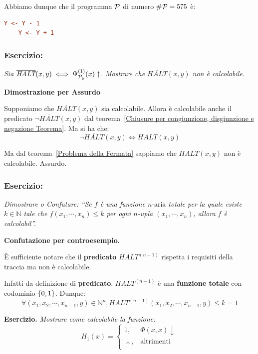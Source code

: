 Abbiamo dunque che il programma \(\mathcal{P}\) di numero \#\(\mathcal{P}=575\) è:
\begin{lstlisting}[language=ini, label={Codifica 3 es},  caption= Esercizio Codifica Programmi 3]
    Y <- Y - 1
    Y <- Y + 1
\end{lstlisting}

\subsubsection*{Esercizio:} \textit{Sia \(\overline{\textit{HALT}}(x,y) \iff \Psi_{\mathcal{P}_y}^{(1)}(x) \uparrow \). Mostrare che \(\overline{\textit{HALT}}(x,y)\) non è calcolabile.}

\textbf{Dimostrazione per Assurdo}

Supponiamo che \(\overline{\textit{HALT}}(x,y)\) sia calcolabile. Allora è calcolabile anche il predicato \(\neg \overline{\textit{HALT}}(x,y)\) dal teorema~\ref{Chiusure per congiunzione, disgiunzione e negazione Teorema}. Ma si ha che:
\begin{equation}
    \neg \overline{\textit{HALT}}(x,y) \iff \textit{HALT}(x,y)
\end{equation}

Ma dal teorema~\ref{Problema della Fermata} sappiamo che \(\textit{HALT}(x,y)\) non è calcolabile. Assurdo.


\subsubsection*{Esercizio:}
\textit{Dimostrare o Confutare: ``Se \(f\) è una funzione \(n\text{-aria}\) totale per la quale esiste \(k\in\mathbb{N}\) tale che \(f(x_1,\cdots,x_n)\leq k\) per ogni \(n\)-upla \((x_1,\cdots,x_n)\), allora \(f\) è calcolabil''.}

\textbf{Confutazione per controesempio.}

È sufficiente notare che il \textbf{predicato} \(\textit{HALT}^{(n-1)}\) rispetta i requisiti della traccia ma non è calcolabile.

Infatti da definizione di \textbf{predicato}, \(\textit{HALT}^{(n-1)}\) è una \textbf{funzione totale} con codominio \(\displaystyle{\left\{{0,1}\right\}}\). Dunque:
\begin{equation}
    \forall (x_1,x_2,\cdots, x_{n-1}, y) \in \mathbb{N}^n, \textit{HALT}^{(n-1)}(x_1,x_2,\cdots, x_{n-1}, y)\leq k=1
\end{equation}

\textbf{Esercizio. } \textit{Mostrare come calcolabile la funzione:}
\begin{equation}
    H_1(x) = \begin{cases}
        1, & \Phi(x,x)\downarrow\\
        \uparrow, & \text{altrimenti}
    \end{cases}
\end{equation}


